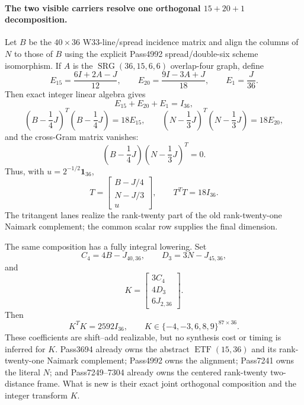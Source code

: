 \paragraph{The two visible carriers resolve one orthogonal $15+20+1$ decomposition.}
Let $B$ be the $40\times36$ W33-line/spread incidence matrix and align the
columns of $N$ to those of $B$ using the explicit Pass4992
spread/double-six scheme isomorphism.  If $A$ is the
$\operatorname{SRG}(36,15,6,6)$ overlap-four graph, define
\[
 E_{15}=\frac{6I+2A-J}{12},\qquad
 E_{20}=\frac{9I-3A+J}{18},\qquad E_1=\frac{J}{36}.
\]
Then exact integer linear algebra gives
\[
 E_{15}+E_{20}+E_1=I_{36},
\]
\[
 \left(B-\frac14J\right)^{\!T}\left(B-\frac14J\right)=18E_{15},
 \qquad
 \left(N-\frac13J\right)^{\!T}\left(N-\frac13J\right)=18E_{20},
\]
and the cross-Gram matrix vanishes:
\[
 \boxed{\left(B-\frac14J\right)\left(N-\frac13J\right)^{\!T}=0.}
\]
Thus, with $u=2^{-1/2}\mathbf 1_{36}$,
\[
 T=\begin{bmatrix}B-J/4\\N-J/3\\u\end{bmatrix},
 \qquad \boxed{T^TT=18I_{36}}.
\]
The tritangent lanes realize the rank-twenty part of the old rank-twenty-one
Naimark complement; the common scalar row supplies the final dimension.

The same composition has a fully integral lowering.  Set
\[
 C_4=4B-J_{40,36},\qquad D_3=3N-J_{45,36},
\]
and
\[
 K=\begin{bmatrix}3C_4\\4D_3\\6J_{2,36}\end{bmatrix}.
\]
Then
\[
 \boxed{K^TK=2592I_{36}},\qquad
 K\in\{-4,-3,6,8,9\}^{87\times36}.
\]
These coefficients are shift--add realizable, but no synthesis cost or timing
is inferred for $K$.  Pass3694
 already owns the
abstract $\operatorname{ETF}(15,36)$ and its rank-twenty-one Naimark
complement; Pass4992
 owns the alignment; Pass7241 owns
the literal $N$; and
Pass7249--7304
 already owns the
centered rank-twenty two-distance frame.  What is new is their exact joint
orthogonal composition and the integer transform $K$.

